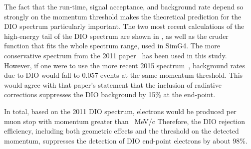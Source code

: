 \FigDIOEndPointComparison
The fact that the run-time, signal acceptance, and background rate depend so strongly on the momentum threshold makes the theoretical prediction for the \ac{DIO} spectrum particularly important.
The two most recent calculations of the high-energy tail of the DIO spectrum are shown in , as well as the cruder function that fits the whole spectrum range, used in SimG4.
The more conservative spectrum from the 2011 paper~\cite{Czarnecki2011} has been used in this study.
However, if one were to use the more recent 2015 spectrum~\cite{Czarnecki2014}, background rates due to DIO would fall to 0.057 events at the same momentum threshold.
This would agree with that paper's statement that the inclusion of radiative corrections suppresses the DIO background by 15\% at the end-point.

In total, based on the 2011 DIO spectrum,  electrons would be produced per muon stop with momentum greater than \VarMomThreshold~MeV/c
Therefore, the DIO rejection efficiency, including both geometric effects and the threshold on the detected momentum, suppresses the detection of DIO end-point electrons by about 98\%.

